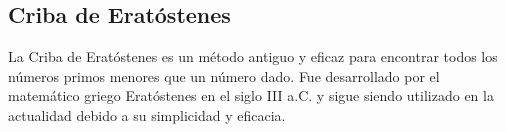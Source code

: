 \subsection{Criba de Eratóstenes}
La Criba de Eratóstenes es un método antiguo y eficaz para encontrar todos los números primos menores que un número dado. Fue desarrollado por el matemático griego Eratóstenes en el siglo III a.C. y sigue siendo utilizado en la actualidad debido a su simplicidad y eficacia.

